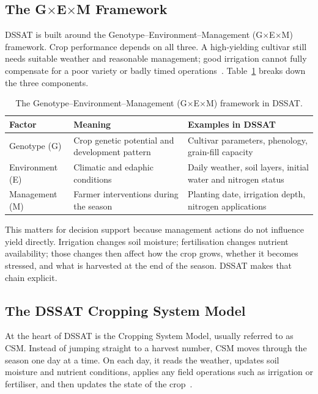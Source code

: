 \subsection{The G$\times$E$\times$M Framework}

DSSAT is built around the Genotype--Environment--Management (G$\times$E$\times$M)
framework. Crop performance depends on all three. A high-yielding cultivar still
needs suitable weather and reasonable management; good irrigation cannot fully
compensate for a poor variety or badly timed
operations~\cite{boote2019cropmodelling}. Table~\ref{tab:gxem} breaks down the
three components.

\begin{table}[ht]
  \centering
  \caption{The Genotype--Environment--Management (G$\times$E$\times$M) framework in DSSAT.}
  \label{tab:gxem}
  \begin{tabular}{p{2.5cm} p{4.3cm} p{6.5cm}}
    \toprule
    \textbf{Factor} & \textbf{Meaning} & \textbf{Examples in DSSAT} \\
    \midrule
    Genotype (G) &
    Crop genetic potential and development pattern &
    Cultivar parameters, phenology, grain-fill capacity \\[4pt]

    Environment (E) &
    Climatic and edaphic conditions &
    Daily weather, soil layers, initial water and nitrogen status \\[4pt]

    Management (M) &
    Farmer interventions during the season &
    Planting date, irrigation depth, nitrogen applications \\
    \bottomrule
  \end{tabular}
\end{table}

This matters for decision support because management actions do not influence
yield directly. Irrigation changes soil moisture; fertilisation changes nutrient
availability; those changes then affect how the crop grows, whether it becomes
stressed, and what is harvested at the end of the season. DSSAT makes that chain
explicit.


\subsection{The DSSAT Cropping System Model}

At the heart of DSSAT is the Cropping System Model, usually referred to as CSM.
Instead of jumping straight to a harvest number, CSM moves through the season one
day at a time. On each day, it reads the weather, updates soil moisture and
nutrient conditions, applies any field operations such as irrigation or
fertiliser, and then updates the state of the
crop~\cite{hoogenboom2019dssat}.

